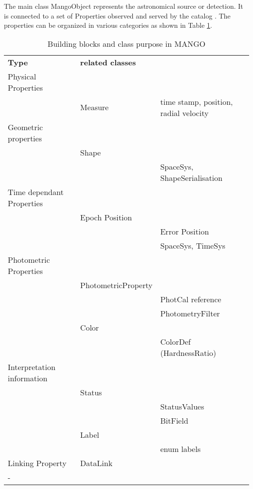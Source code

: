  
 The main class MangoObject represents the astronomical source or detection.
 It is connected to a set of Properties observed and served by the catalog . 
 The properties  can be organized in various categories  as shown in Table \ref{tab:modelelement}.

 \begin{table}[ht]
  \begin{center}
  \caption{Building blocks and class purpose in MANGO }
  \label{tab:modelelement}
    \begin{tabular}{p{}p{} p{}}
    \sptablerule
     \textbf{Type}  & \textbf{related classes}   &                     \\\sptablerule
       Physical Properties         &         &                    \\
      & Measure &time stamp, position, radial velocity        \\\sptablerule
      Geometric properties          &  & \\
            &Shape  &      \\
          & & SpaceSys, ShapeSerialisation                          \\\sptablerule
      Time dependant Properties    &    &                   \\
        & Epoch Position     &                  \\
       & & Error Position              \\
       & &SpaceSys, TimeSys               \\\sptablerule
     Photometric Properties   &  &   \\
         &  PhotometricProperty   &      \\           
       & & PhotCal reference         \\
         & & PhotometryFilter  \\
          & Color & \\   
             &   & ColorDef (HardnessRatio)  \\\sptablerule
       Interpretation information  &       &  \\
         &Status \\
           & &StatusValues \\
           & &BitField \\  
         & Label & \\
         &  & enum labels \\\sptablerule
         Linking Property 
         &  DataLink &  \\\sptablerule-    \end{tabular}
 \end{center}
\end{table}

\pagebreak 
